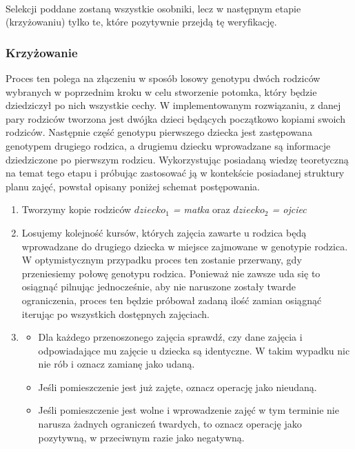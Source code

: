 \paragraph{}Selekcji poddane zostaną wszystkie osobniki, lecz w następnym etapie (krzyżowaniu) tylko te, które pozytywnie przejdą tę weryfikację.
\subsubsection{Krzyżowanie}
Proces ten polega na złączeniu w sposób losowy genotypu dwóch rodziców wybranych w poprzednim kroku w celu stworzenie potomka, który będzie dziedziczył po nich wszystkie cechy. W implementowanym rozwiązaniu, z danej pary rodziców tworzona jest dwójka dzieci będących początkowo kopiami swoich rodziców. Następnie część genotypu pierwszego dziecka jest zastępowana genotypem drugiego rodzica, a drugiemu dziecku wprowadzane są informacje dziedziczone po pierwszym rodzicu. Wykorzystując posiadaną wiedzę teoretyczną na temat tego etapu i próbując zastosować ją w kontekście posiadanej struktury planu zajęć, powstał opisany poniżej schemat postępowania.
\begin{enumerate}
\item Tworzymy kopie rodziców \emph{$dziecko_1$ = matka} oraz \emph{$dziecko_2$ = ojciec}
\item Losujemy kolejność kursów, których zajęcia zawarte u rodzica będą wprowadzane do drugiego dziecka w miejsce zajmowane w genotypie rodzica. W optymistycznym przypadku proces ten zostanie przerwany, gdy przeniesiemy połowę genotypu rodzica. Ponieważ nie zawsze uda się to osiągnąć pilnując jednocześnie, aby nie naruszone zostały twarde ograniczenia, proces ten będzie próbował zadaną ilość zamian osiągnąć iterując po wszystkich dostępnych zajęciach.
\item 
\begin{itemize}
\item Dla każdego przenoszonego zajęcia sprawdź, czy dane zajęcia i odpowiadające mu zajęcie u dziecka są identyczne. W takim wypadku nic nie rób i oznacz zamianę jako udaną.
\item Jeśli pomieszczenie jest już zajęte, oznacz operację jako nieudaną.
\item Jeśli pomieszczenie jest wolne i wprowadzenie zajęć w tym terminie nie narusza żadnych ograniczeń twardych, to oznacz operację jako pozytywną, w przeciwnym razie jako negatywną.
\end{itemize}
\end{enumerate}
